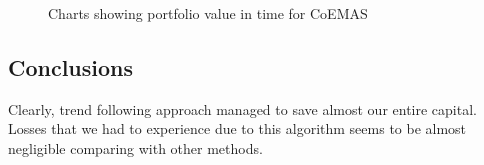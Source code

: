 \begin{figure}[htb]
  \caption{Charts showing portfolio value in time for CoEMAS}
\label{fig:CoEMAS_CEA_2}
\end{figure}

\subsection{Conclusions}

Clearly, trend following approach managed to save almost our entire capital.
Losses that we had to experience due to this algorithm seems to be almost negligible comparing with other methods.

